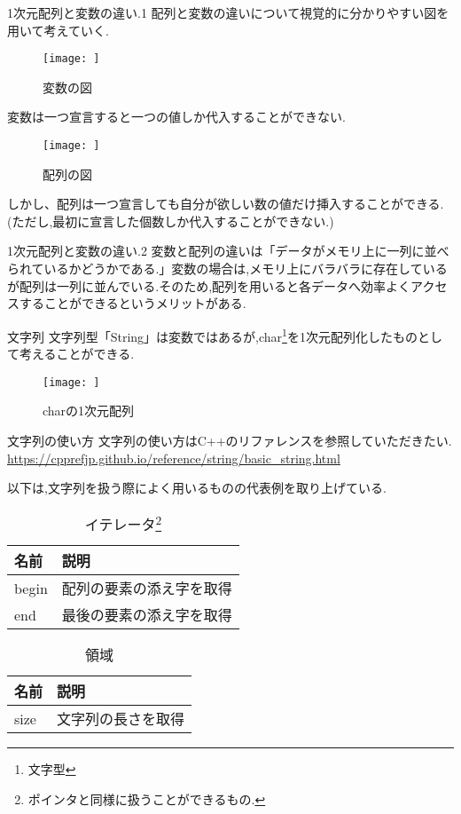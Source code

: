 \documentclass[xdvipdfmx, 8pt, t]{beamer}
\begin{document}
\begin{frame}{1次元配列と変数の違い.1}
    配列と変数の違いについて視覚的に分かりやすい図を用いて考えていく.
    \begin{figure}[h]
        \centering
        \texttt{[image: ]}
        \caption{変数の図}
        \label{fig:enter-label}
    \end{figure}
    変数は一つ宣言すると一つの値しか代入することができない.
    \begin{figure}[h]
        \centering
        \texttt{[image: ]}
        \caption{配列の図}
        \label{fig:enter-label}
    \end{figure}
    しかし、配列は一つ宣言しても自分が欲しい数の値だけ挿入することができる.(ただし,最初に宣言した個数しか代入することができない.)
\end{frame}
\begin{frame}{1次元配列と変数の違い.2}
    変数と配列の違いは「データがメモリ上に一列に並べられているかどうかである.」変数の場合は,メモリ上にバラバラに存在しているが配列は一列に並んでいる.そのため,配列を用いると各データへ効率よくアクセスすることができるというメリットがある.
\end{frame}

\begin{frame}{文字列}
    文字列型「String」は変数ではあるが,char\footnote{文字型}を1次元配列化したものとして考えることができる.
    \begin{figure}[h]
        \centering
        \texttt{[image: ]}
        \caption{charの1次元配列}
        \label{fig:enter-label}
    \end{figure}
\end{frame}

\begin{frame}{文字列の使い方}
    文字列の使い方はC++のリファレンスを参照していただきたい.
    \url{https://cpprefjp.github.io/reference/string/basic_string.html}
    
    以下は,文字列を扱う際によく用いるものの代表例を取り上げている.
    \begin{table}[h]
        \centering
        \begin{tabular}{|l|l|}
        \hline
        名前 & 説明 \\
        \hline
        begin & 配列の要素の添え字を取得\\
        end & 最後の要素の添え字を取得\\
        \hline
        \end{tabular}
        \caption{イテレータ\footnote{ポインタと同様に扱うことができるもの.}}
        \label{tab:my_label}
    \end{table}

    \begin{table}[h]
        \centering
        \begin{tabular}{|l|l|}
        \hline
        名前 & 説明\\
        \hline
        size & 文字列の長さを取得\\
        \hline
        \end{tabular}
        \caption{領域}
        \label{tab:my_label}
    \end{table}
\end{frame}
\end{document}
